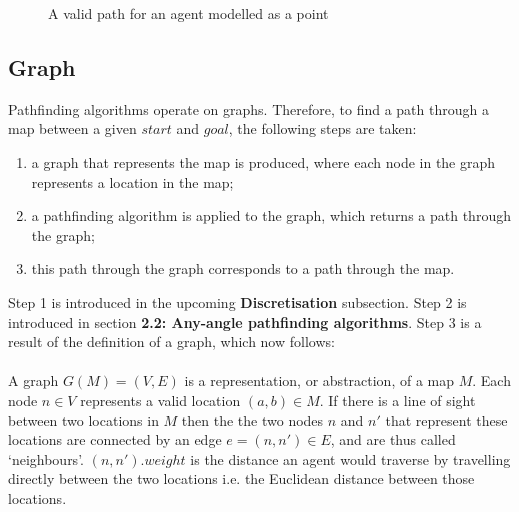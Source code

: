 \documentclass[12pt,notitlepage]{report}
\begin{document}
\begin{figure}
    \centering
  \caption{A valid path for an agent modelled as a point}
\end{figure}

\subsection{Graph}

Pathfinding algorithms operate on graphs. Therefore, to find a path through a map between a given $start$ and $goal$, the following steps are taken:
\begin{enumerate}
\item a graph that represents the map is produced, where each node in the graph represents a location in the map; 
\item a pathfinding algorithm is applied to the graph, which returns a path through the graph;
\item this path through the graph corresponds to a path through the map.
\end{enumerate}
Step 1 is introduced in the upcoming {\bfseries Discretisation} subsection. Step 2 is introduced in section {\bfseries 2.2: Any-angle pathfinding algorithms}. Step 3 is a result of the definition of a graph, which now follows:\\

\\
\noindent
A graph $G(M)=(V,E)$ is a representation, or abstraction, of a map $M$. Each node $n \in V$ represents a valid location $(a,b) \in M$. If there is a line of sight between two locations in $M$ then the the two nodes $n$ and $n'$ that represent these locations are connected by an edge $e=(n,n') \in E$, and are thus called `neighbours'. $(n,n').weight$ is the distance an agent would traverse by travelling directly between the two locations i.e. the Euclidean distance between those locations.
\end{document}
